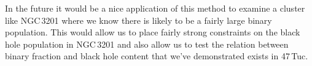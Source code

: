 In the future it would be a nice application of this method to examine a cluster like NGC\,3201
where we know there is likely to be a fairly large binary population. This would allow us to place
fairly strong constraints on the black hole population in NGC\,3201 and also allow us to test the
relation between binary fraction and black hole content that we've demonstrated exists in 47\,Tuc.